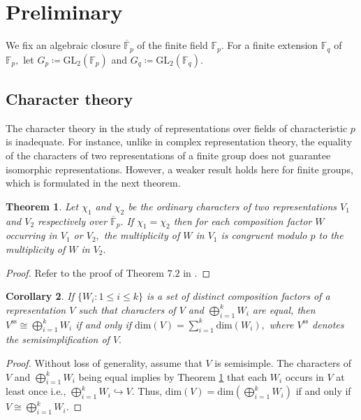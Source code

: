 \documentclass[10pt, reqno]{amsart}
\def\F{{\mathbb F}}
\def\OF{{\overline{\mathbb F}}_p}
\def\Gq{{G_q}}
\def\Gp{{G_p}}
\numberwithin{equation}{section}
\newtheorem{theorem}{Theorem}[section] %
\newtheorem{corollary}[theorem]{Corollary}%
\theoremstyle{remark}
\begin{document}
	\section{Preliminary}\label{S2}
	We fix an algebraic closure ${\OF}$ of the finite field $\F_p.$ For a finite extension $\F_q$ of $\F_p,$ let $\Gp\coloneqq\mathrm{GL}_2(\F_p)$ and $\Gq\coloneqq\mathrm{GL}_2(\F_q).$
    
\subsection{Character theory}
	
	The character theory in the study of representations over fields of characteristic $p$ is inadequate. For instance, unlike in complex representation theory, the equality of the characters of two representations of a finite group does not guarantee isomorphic representations. However, a weaker result holds here for finite groups, which is formulated in the next theorem.

\begin{theorem}\label{T5}
		Let $\chi_1$ and $\chi_2$ be the ordinary characters of two representations $V_1$ and $V_2$ respectively over $\OF.$ If $\chi_1=\chi_2$ then for each composition factor $W$ occurring in $V_1$ or $V_2,$ the multiplicity of $W$ in $V_1$ is congruent modulo $p$ to the multiplicity of $W$ in $V_2.$
	\end{theorem}
	
	\begin{proof}
		Refer to the proof of Theorem $7.2$ in \cite{DB}.
	\end{proof}
	\begin{corollary}\label{C}
		If $\{W_i: 1\leq i\leq k\}$ is a set of distinct composition factors of a representation $V$ such that characters of $V$ and $\bigoplus\limits_{i=1}^k W_i$ are equal, then	$V^{\mathrm{ss}}\cong\bigoplus\limits_{i=1}^k W_i$ if and only if $\text{dim}(V)=\sum\limits_{i=1}^k\text{dim}(W_i),$ where $V^{\textrm{ss}}$ denotes the semisimplification of $V.$
 
	\end{corollary}
    
	\begin{proof}
		Without loss of generality, assume that $V$ is semisimple. The characters of $V$ and $\bigoplus\limits_{i=1}^k W_i$ being equal implies by Theorem \ref{T5} that each $W_i$ occurs in $V$ at least once i.e., $\bigoplus\limits_{i=1}^k W_i\hookrightarrow V.$ Thus, $\text{dim}(V)=\text{dim}\left(\bigoplus\limits_{i=1}^k W_i\right)$ if and only if  $V\cong\bigoplus\limits_{i=1}^k W_i.$
	\end{proof}
\end{document}
